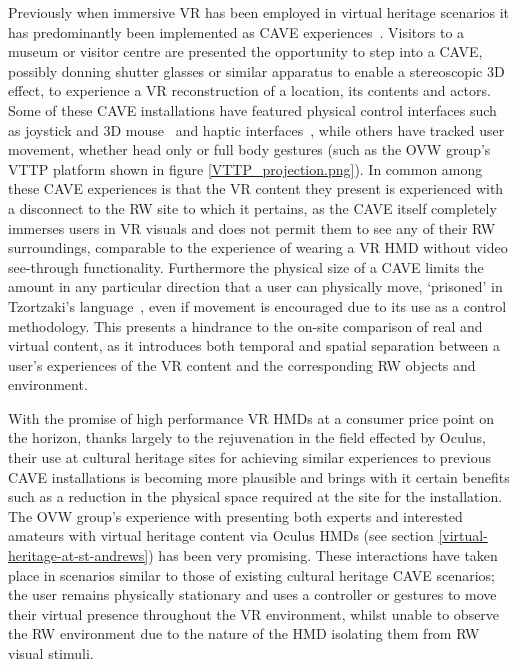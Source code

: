 Previously when immersive VR has been employed in virtual heritage scenarios it has predominantly been implemented as CAVE experiences~\cite{Roussou2002}. Visitors to a museum or visitor centre are presented the opportunity to step into a CAVE, possibly donning shutter glasses or similar apparatus to enable a stereoscopic 3D effect, to experience a VR reconstruction of a location, its contents and actors. Some of these CAVE installations have featured physical control interfaces such as joystick and 3D mouse~\cite{cabral:x3dexperience} and haptic interfaces~\cite{Christou2006}, while others have tracked user movement, whether head only or full body  gestures (such as the OVW group's VTTP platform shown in figure \ref{VTTP_projection.png}). In common among these CAVE experiences is that the VR content they present is experienced with a disconnect to the RW site to which it pertains, as the CAVE itself completely immerses users in VR visuals and does not permit them to see any of their RW surroundings, comparable to the experience of wearing a VR HMD without video see-through functionality. Furthermore the physical size of a CAVE limits the amount in any particular direction that a user can physically move, `prisoned' in Tzortzaki's language~\cite{Tzortzaki2002}, even if movement is encouraged due to its use as a control methodology. This presents a hindrance to the on-site comparison of real and virtual content, as it introduces both temporal and spatial separation between a user's experiences of the VR content and the corresponding RW objects and environment.

With the promise of high performance VR HMDs at a consumer price point on the horizon, thanks largely to the rejuvenation in the field effected by Oculus, their use at cultural heritage sites for achieving similar experiences to previous CAVE installations is becoming more plausible and brings with it certain benefits such as a reduction in the physical space required at the site for the installation. The OVW group's experience with presenting both experts and interested amateurs with virtual heritage content via Oculus HMDs (see section \ref{virtual-heritage-at-st-andrews}) has been very promising. These interactions have taken place in scenarios similar to those of existing cultural heritage CAVE scenarios; the user remains physically stationary and uses a controller or gestures to move their virtual presence throughout the VR environment, whilst unable to observe the RW environment due to the nature of the HMD isolating them from RW visual stimuli.

